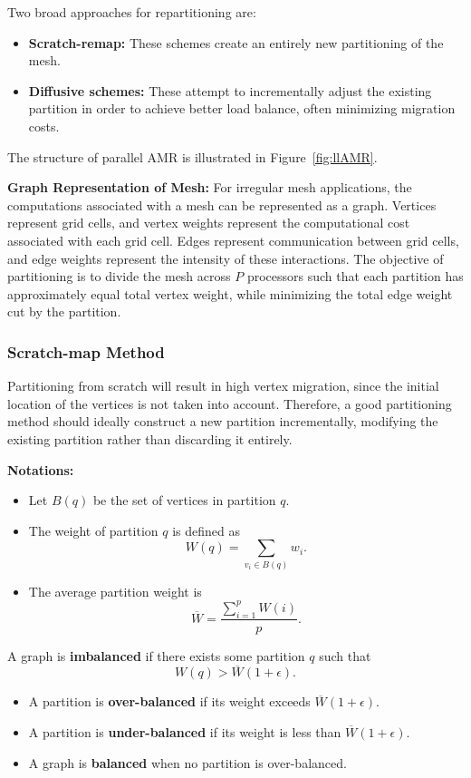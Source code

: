 \documentclass[12pt]{book}
\begin{document}
Two broad approaches for repartitioning are:
\begin{itemize}
    \item \textbf{Scratch-remap:} These schemes create an entirely new partitioning of the mesh.
    \item \textbf{Diffusive schemes:} These attempt to incrementally adjust the existing partition in order to achieve better load balance, often minimizing migration costs.
\end{itemize}

The structure of parallel AMR is illustrated in Figure~\ref{fig:llAMR}. 

\textbf{Graph Representation of Mesh:} For irregular mesh applications, the computations associated with a mesh can be represented as a graph. Vertices represent grid cells, and vertex weights represent the computational cost associated with each grid cell. Edges represent communication between grid cells, and edge weights represent the intensity of these interactions. The objective of partitioning is to divide the mesh across $P$ processors such that each partition has approximately equal total vertex weight, while minimizing the total edge weight cut by the partition.

\subsubsection{Scratch-map Method}
Partitioning from scratch will result in high vertex migration, since the initial location of the vertices is not taken into account. Therefore, a good partitioning method should ideally construct a new partition incrementally, modifying the existing partition rather than discarding it entirely.

\textbf{Notations:} 
\begin{itemize}
    \item Let $B(q)$ be the set of vertices in partition $q$. 
    \item The weight of partition $q$ is defined as 
    \[
    W(q) = \sum_{v_i \in B(q)} w_i.
    \]
    \item The average partition weight is 
    \[
    \overline{W} = \frac{\sum_{i=1}^p W(i)}{p}.
    \]
\end{itemize}

A graph is \textbf{imbalanced} if there exists some partition $q$ such that 
\[
W(q) > \overline{W}(1+\epsilon).
\]
\begin{itemize}
    \item A partition is \textbf{over-balanced} if its weight exceeds $\overline{W}(1+\epsilon)$.
    \item A partition is \textbf{under-balanced} if its weight is less than $\overline{W}(1+\epsilon)$.
    \item A graph is \textbf{balanced} when no partition is over-balanced.
\end{itemize}
\end{document}
